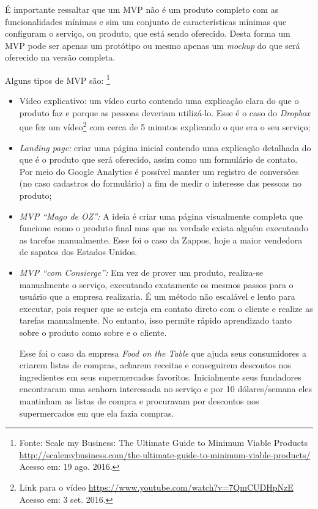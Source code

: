     \par É importante ressaltar que um MVP não é um produto completo com as funcionalidades mínimas e sim um conjunto de características mínimas que configuram o serviço, ou produto, que está sendo oferecido. Desta forma um MVP pode ser apenas um protótipo ou mesmo apenas um \emph{mockup} do que será oferecido na versão completa.
    \par Alguns tipos de MVP são: \footnote{ Fonte: Scale my Business: The Ultimate Guide to Minimum Viable Products  \url{http://scalemybusiness.com/the-ultimate-guide-to-minimum-viable-products/} Acesso em: 19 ago. 2016.}
\begin{itemize}
\item Vídeo explicativo: um vídeo curto contendo uma explicação clara do que o produto faz e porque as pessoas deveriam utilizá-lo. Esse é o caso do \emph{Dropbox} que fez um vídeo\footnote{Link para o vídeo  \url{https://www.youtube.com/watch?v=7QmCUDHpNzE} Acesso em: 3 set. 2016.} com cerca de 5 minutos explicando o que era o seu serviço;
\item \emph{Landing page:}
criar uma página inicial contendo uma explicação detalhada do que é o produto que será oferecido, assim como um formulário de contato. Por meio do Google Analytics é possível manter um registro de conversões (no caso cadastros do formulário) a fim de medir o interesse das pessoas no produto;
\item \emph{MVP ``Mago de OZ'':}
A ideia é criar uma página visualmente completa que funcione como o produto final mas que na verdade exista alguém executando as tarefas manualmente. Esse foi o caso da Zappos, hoje a maior vendedora de sapatos dos Estados Unidos.
\item \emph{ MVP ``com Consierge'':}
Em vez de prover um produto, realiza-se manualmente o serviço, executando exatamente os mesmos passos para o usuário que a empresa realizaria. É um método não escalável e lento para executar, pois requer que se esteja em contato direto com o cliente e realize as tarefas manualmente. No entanto, isso permite rápido aprendizado tanto sobre o produto como sobre e o cliente.
\par Esse foi o caso da empresa \emph{Food on the Table} que ajuda seus consumidores a criarem listas de compras, acharem receitas e conseguirem descontos nos ingredientes em seus supermercados favoritos. Inicialmente seus fundadores encontraram uma senhora interessada no serviço e por 10 dólares/semana eles mantinham as listas de compra e procuravam por descontos nos supermercados em que ela fazia compras.
\end{itemize}


